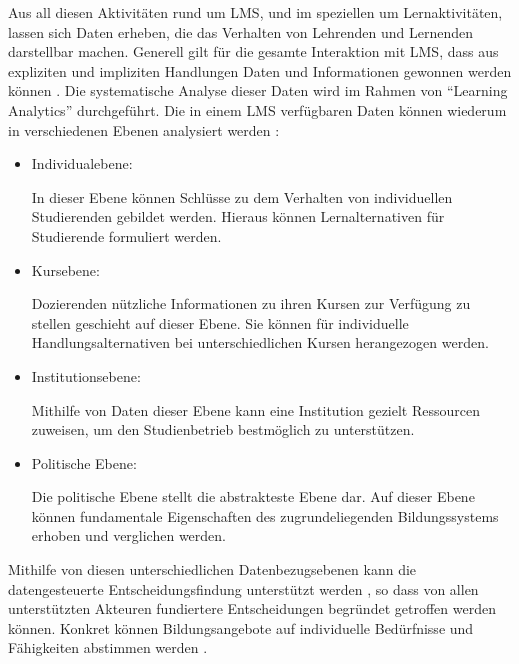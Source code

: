 Aus all diesen Aktivitäten rund um \ac{LMS}, und im speziellen um Lernaktivitäten, lassen sich Daten erheben, die das Verhalten von Lehrenden und Lernenden darstellbar machen. Generell gilt für die gesamte Interaktion mit \ac{LMS}, dass aus expliziten und impliziten Handlungen Daten und Informationen gewonnen werden können \autocite[S.26]{2012HorizonReport}. Die systematische Analyse dieser Daten wird im Rahmen von \enquote{Learning Analytics} durchgeführt. Die in einem \ac{LMS} verfügbaren Daten können wiederum in verschiedenen Ebenen analysiert werden \autocite[S.2f]{learningAnalyticsImHochschulkontext} \autocite{penetratingTheFogAnalyticsInLearningAndEducation}:

\begin{itemize}
	\item Individualebene: 
	
		In dieser Ebene können Schlüsse zu dem Verhalten von individuellen Studierenden gebildet werden. Hieraus können Lernalternativen für Studierende formuliert werden.
		
	\item Kursebene:
	
		Dozierenden nützliche Informationen zu ihren Kursen zur Verfügung zu stellen geschieht auf dieser Ebene. Sie können für individuelle Handlungsalternativen bei unterschiedlichen Kursen herangezogen werden. 
	
	\item Institutionsebene:
	
		Mithilfe von Daten dieser Ebene kann eine Institution gezielt Ressourcen zuweisen, um den Studienbetrieb bestmöglich zu unterstützen.  
	
	\item Politische Ebene:
	
		Die politische Ebene stellt die abstrakteste Ebene dar. Auf dieser Ebene können fundamentale Eigenschaften des zugrundeliegenden Bildungssystems erhoben und verglichen werden.
	
\end{itemize}

Mithilfe von diesen unterschiedlichen Datenbezugsebenen kann die datengesteuerte Entscheidungsfindung unterstützt werden \autocite[S.19]{theEvolutionOfBigDataAndLearningAnalyticsInAmericanHigherEducation}, so dass von allen unterstützten Akteuren fundiertere Entscheidungen begründet getroffen werden können. Konkret können Bildungsangebote auf individuelle Bedürfnisse und Fähigkeiten abstimmen werden \autocite[S.26]{2012HorizonReport}.



